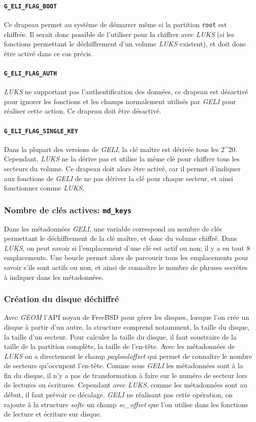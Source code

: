\paragraph{\texttt{G\_ELI\_FLAG\_BOOT}}
Ce drapeau permet au système de démarrer même si la partition \texttt{root} est
chiffrée. Il serait donc possible de l'utiliser pour la chiffrer avec
\textit{LUKS} (si les fonctions permettant le déchiffrement d'un volume
\textit{LUKS} existent), et doit donc être activé dans ce cas précis.
\paragraph{\texttt{G\_ELI\_FLAG\_AUTH}}
\textit{LUKS} ne supportant pas l'authentification des données, ce drapeau est
désactivé pour ignorer les fonctions et les champs normalement utilisés par
\textit{GELI} pour réaliser cette action. Ce drapeau doit être désactivé.
\paragraph{\texttt{G\_ELI\_FLAG\_SINGLE\_KEY}}
Dans la plupart des versions de \textit{GELI}, la clé maître est dérivée tous
les 2\textasciicircum20. Cependant, \textit{LUKS} ne la dérive pas et utilise la
même clé pour chiffrer tous les secteurs du volume. Ce drapeau doit alors être
activé, car il permet d'indiquer aux fonctions de \textit{GELI} de ne pas
dériver la clé pour chaque secteur, et ainsi fonctionner comme \textit{LUKS}.

\subsubsection{Nombre de clés actives: \texttt{md\_keys}}
Dans les métadonnées \textit{GELI}, une variable correspond au nombre de clés
permettant le déchiffrement de la clé maître, et donc du volume chiffré. Dans
\textit{LUKS}, on peut savoir si l'emplacement d'une clé est actif ou non; il y
a en tout 8 emplacements. Une boucle permet alors de parcourir tous les
emplacements pour savoir s'ils sont actifs ou non, et ainsi de connaître le
nombre de phrases secrètes à indiquer dans les métadonnées.

\subsubsection{Création du disque déchiffré}
Avec {\em GEOM} l'API noyau de FreeBSD pour gérer les disques, lorsque l'on
crée un disque à partir d'un autre, la structure comprend notamment, la taille
du disque, la taille d'un secteur. Pour calculer la taille du disque, il faut
soustraire de la taille de la partition complète, la taille de l'en-tête. 
Avec les métadonnées de {\em LUKS} on a directement le champ {\em payloadoffset}
qui permet de connaître le nombre de secteurs qu'occupent l'en-tête. Comme sous
{\em GELI} les métadonnées sont à la fin du disque, il n'y a pas de
transformation à faire sur le numéro de secteur lors de lectures ou écritures.
Cependant avec {\em LUKS}, comme les métadonnées sont au début, il faut prévoir
ce décalage. {\em GELI} ne réalisant pas cette opération, on rajoute
à la structure {\em softc} un champ {\em sc\_offset} que l'on utilise dans les
fonctions de lecture et écriture sur disque.


